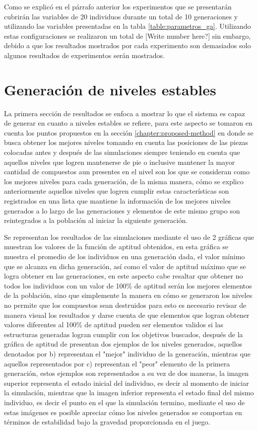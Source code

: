 Como se explicó en el párrafo anterior los experimentos que se presentarán
cubrirán las variables de 20 individuos durante un total de 10 generaciones y
utilizando las variables presentadas en la tabla \ref{table:parametros_ga}.
Utilizando estas configuraciones se realizaron un total de [Write number here?]
sin embargo, debido a que los resultados mostrados por cada experimento son
demasiados solo algunos resultados de experimentos serán mostrados.

\section{Generación de niveles estables}
\label{section:chap6_stable_level_generation}

La primera sección de resultados se enfoca a mostrar lo que el sistema es capaz
de generar en cuanto a niveles estables se refiere, para este aspecto se tomaron
en cuenta los puntos propuestos en la sección \ref{chapter:proposed-method} en
donde se busca obtener los mejores niveles tomando en cuenta las posiciones de
las piezas colocadas antes y después de las simulaciones siempre teniendo en
cuenta que aquellos niveles que logren mantenerse de pie o inclusive mantener la
mayor cantidad de compuestos aun presentes en el nivel son los que se consideran
como los mejores niveles para cada generación, de la misma manera, cómo se
explico anteriormente aquellos niveles que logren cumplir estas características
son registrados en una lista que mantiene la información de los mejores niveles
generados a lo largo de las generaciones y elementos de este mismo grupo son
reintegrados a la población al iniciar la siguiente generación.

Se representan los resultados de las simulaciones mediante
el uso de 2 gráficas que muestran los valores de la función de aptitud
obtenidos, en esta gráfica se muestra el promedio de los individuos en una
generación dada, el valor mínimo que se alcanza en dicha generación, así como el
valor de aptitud máximo que se logra obtener en las generaciones, en este
aspecto cabe resaltar que obtener no todos los individuos con un valor de 100\%
de aptitud serán los mejores elementos de la población, sino que simplemente la
manera en cómo se generaron los niveles no permite que los compuestos sean
destruidos para esto es necesario revisar de manera visual los resultados y
darse cuenta de que elementos que logran obtener valores diferentes al 100\% de
aptitud pueden ser elementos validos si las estructuras generadas logran cumplir
con los objetivos buscados, después de la gráfica de aptitud de presentan dos
ejemplos de los niveles generados, aquellos denotados por b) representan el
"mejor" individuo de la generación, mientras que aquellos representados por c)
representan el "peor" elemento de la primera generación, estos ejemplos son
representados a su vez de dos maneras, la imagen superior representa el estado
inicial del individuo, es decir al momento de iniciar la simulación, mientras
que la imagen inferior representa el estado final del mismo individuo, es decir
el punto en el que la simulación termino, mediante el uso de estas imágenes es
posible apreciar cómo los niveles generados se comportan en
términos de estabilidad bajo la gravedad proporcionada en el juego.

